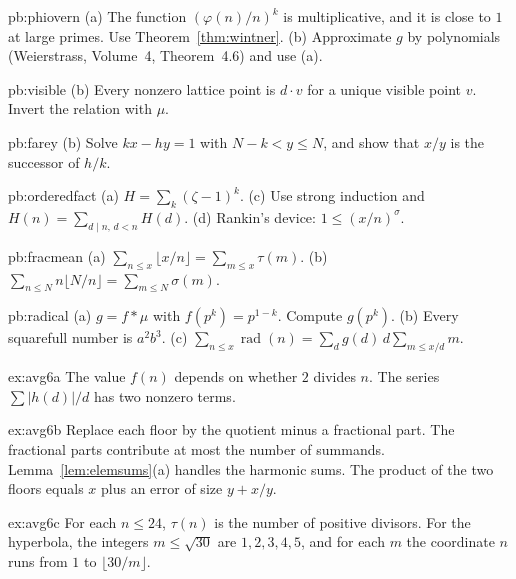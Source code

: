 \begin{hint}{pb:phiovern}
(a) The function $(\varphi(n)/n)^k$ is multiplicative, and it is close to $1$ at large primes. Use Theorem~\ref{thm:wintner}.
(b) Approximate $g$ by polynomials (Weierstrass, Volume~4, Theorem~4.6) and use (a).
\end{hint}

\begin{hint}{pb:visible}
(b) Every nonzero lattice point is $d\cdot v$ for a unique visible point $v$. Invert the relation with $\mu$.
\end{hint}

\begin{hint}{pb:farey}
(b) Solve $kx-hy=1$ with $N-k<y\le N$, and show that $x/y$ is the successor of $h/k$.
\end{hint}

\begin{hint}{pb:orderedfact}
(a) $H=\sum_k(\zeta-1)^k$. (c) Use strong induction and $H(n)=\sum_{d\mid n,\,d<n}H(d)$. (d) Rankin's device: $1\le(x/n)^\sigma$.
\end{hint}

\begin{hint}{pb:fracmean}
(a) $\sum_{n\le x}\lfloor x/n\rfloor=\sum_{m\le x}\tau(m)$. (b) $\sum_{n\le N}n\lfloor N/n\rfloor=\sum_{m\le N}\sigma(m)$.
\end{hint}

\begin{hint}{pb:radical}
(a) $g=f*\mu$ with $f(p^k)=p^{1-k}$. Compute $g(p^k)$. (b) Every squarefull number is $a^2b^3$. (c) $\sum_{n\le x}\operatorname{rad}(n)=\sum_d g(d)\,d\sum_{m\le x/d}m$.
\end{hint}

\begin{hint}{ex:avg6a}
The value $f(n)$ depends on whether $2$ divides $n$. The series $\sum|h(d)|/d$ has two nonzero terms.
\end{hint}

\begin{hint}{ex:avg6b}
Replace each floor by the quotient minus a fractional part. The fractional parts contribute at most the number of summands. Lemma~\ref{lem:elemsums}(a) handles the harmonic sums. The product of the two floors equals $x$ plus an error of size $y+x/y$.
\end{hint}

\begin{hint}{ex:avg6c}
For each $n\le24$, $\tau(n)$ is the number of positive divisors. For the hyperbola, the integers $m\le\sqrt{30}$ are $1,2,3,4,5$, and for each $m$ the coordinate $n$ runs from $1$ to $\lfloor30/m\rfloor$.
\end{hint}

